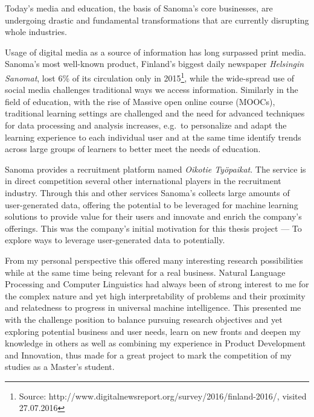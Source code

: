 
Today's media and education, the basis of Sanoma's core businesses, are undergoing drastic and fundamental transformations that are currently disrupting whole industries.

Usage of digital media as a source of information has long surpassed print media. Sanoma's most well-known product, Finland's biggest daily newspaper \emph{Helsingin Sanomat}, lost 6\% of its circulation only in 2015\footnote{Source: http://www.digitalnewsreport.org/survey/2016/finland-2016/, visited 27.07.2016}, while the wide-spread use of social media challenges traditional ways we access information. Similarly in the field of education, with the rise of Massive open online course (MOOCs), traditional learning settings are challenged and the need for advanced techniques for data processing and analysis increases, e.g.\ to personalize and adapt the learning experience to each individual user and at the same time identify trends across large groups of learners to better meet the needs of education.

Sanoma provides a recruitment platform named \emph{Oikotie Työpaikat}. The service is in direct competition several other international players in the recruitment industry. Through this and other services Sanoma's collects large amounts of user-generated data, offering the potential to be leveraged for machine learning solutions to provide value for their users and innovate and enrich the company's offerings.
This was the company's initial motivation for this thesis project --- To explore ways to leverage user-generated data to potentially.



From my personal perspective this offered many interesting research possibilities while at the same time being relevant for a real business. Natural Language Processing and Computer Linguistics had always been of strong interest to me for the complex nature and yet high interpretability of problems and their proximity and relatedness to progress in universal machine intelligence. This presented me with the challenge position to balance pursuing research objectives and yet exploring potential business and user needs, learn on new fronts and deepen my knowledge in others as well as combining my experience in Product Development and Innovation, thus made for a great project to mark the competition of my studies as a Master's student.


